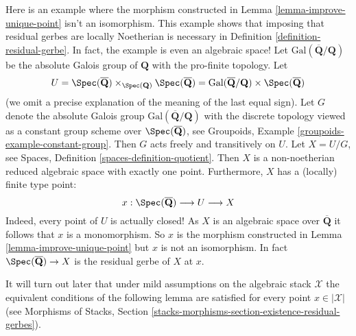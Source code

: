 \begin{example}
\label{example-distinct}
Here is an example where the morphism constructed in
Lemma \ref{lemma-improve-unique-point}
isn't an isomorphism. This example shows that imposing
that residual gerbes are locally Noetherian is necessary in
Definition \ref{definition-residual-gerbe}.
In fact, the example is even an algebraic space!
Let $\text{Gal}(\overline{\mathbf{Q}}/\mathbf{Q})$ be the absolute
Galois group of $\mathbf{Q}$ with the pro-finite topology.
Let
$$
U =
\Spec(\overline{\mathbf{Q}})
\times_{\Spec(\mathbf{Q})}
\Spec(\overline{\mathbf{Q}}) =
\text{Gal}(\overline{\mathbf{Q}}/\mathbf{Q}) \times
\Spec(\overline{\mathbf{Q}})
$$
(we omit a precise explanation of the meaning of the last equal sign).
Let $G$ denote the absolute Galois group
$\text{Gal}(\overline{\mathbf{Q}}/\mathbf{Q})$ with the discrete
topology viewed as a constant group scheme over
$\Spec(\overline{\mathbf{Q}})$, see
Groupoids, Example \ref{groupoids-example-constant-group}.
Then $G$ acts freely and transitively on $U$.
Let $X = U/G$, see
Spaces, Definition \ref{spaces-definition-quotient}.
Then $X$ is a non-noetherian reduced algebraic space with exactly one point.
Furthermore, $X$ has a (locally) finite type point:
$$
x :
\Spec(\overline{\mathbf{Q}}) \longrightarrow
U \longrightarrow X
$$
Indeed, every point of $U$ is actually closed!
As $X$ is an algebraic space over $\overline{\mathbf{Q}}$
it follows that $x$ is a monomorphism. So $x$ is the morphism
constructed in
Lemma \ref{lemma-improve-unique-point}
but $x$ is not an isomorphism. In fact
$\Spec(\overline{\mathbf{Q}}) \to X$ is the residual gerbe of $X$ at $x$.
\end{example}

\noindent
It will turn out later that under mild assumptions on the algebraic stack
$\mathcal{X}$ the equivalent conditions of the following lemma are satisfied
for every point $x \in |\mathcal{X}|$ (see Morphisms of Stacks, Section
\ref{stacks-morphisms-section-existence-residual-gerbes}).

